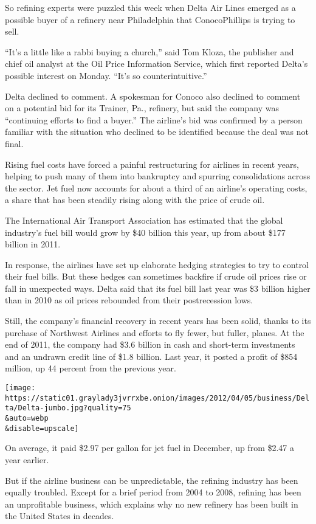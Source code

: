 So refining experts were puzzled this week when Delta Air Lines emerged
as a possible buyer of a refinery near Philadelphia that ConocoPhillips
is trying to sell.

``It's a little like a rabbi buying a church,'' said Tom Kloza, the
publisher and chief oil analyst at the Oil Price Information Service,
which first reported Delta's possible interest on Monday. ``It's so
counterintuitive.''

Delta declined to comment. A spokesman for Conoco also declined to
comment on a potential bid for its Trainer, Pa., refinery, but said the
company was ``continuing efforts to find a buyer.'' The airline's bid
was confirmed by a person familiar with the situation who declined to be
identified because the deal was not final.

Rising fuel costs have forced a painful restructuring for airlines in
recent years, helping to push many of them into bankruptcy and spurring
consolidations across the sector. Jet fuel now accounts for about a
third of an airline's operating costs, a share that has been steadily
rising along with the price of crude oil.

The International Air Transport Association has estimated that the
global industry's fuel bill would grow by \$40 billion this year, up
from about \$177 billion in 2011.

In response, the airlines have set up elaborate hedging strategies to
try to control their fuel bills. But these hedges can sometimes backfire
if crude oil prices rise or fall in unexpected ways. Delta said that its
fuel bill last year was \$3 billion higher than in 2010 as oil prices
rebounded from their postrecession lows.

Still, the company's financial recovery in recent years has been solid,
thanks to its purchase of Northwest Airlines and efforts to fly fewer,
but fuller, planes. At the end of 2011, the company had \$3.6 billion in
cash and short-term investments and an undrawn credit line of \$1.8
billion. Last year, it posted a profit of \$854 million, up 44 percent
from the previous year.

\texttt{[image: https://static01.graylady3jvrrxbe.onion/images/2012/04/05/business/Delta/Delta-jumbo.jpg?quality=75\\\&auto=webp\\\&disable=upscale]}

On average, it paid \$2.97 per gallon for jet fuel in December, up from
\$2.47 a year earlier.

But if the airline business can be unpredictable, the refining industry
has been equally troubled. Except for a brief period from 2004 to 2008,
refining has been an unprofitable business, which explains why no new
refinery has been built in the United States in decades.

